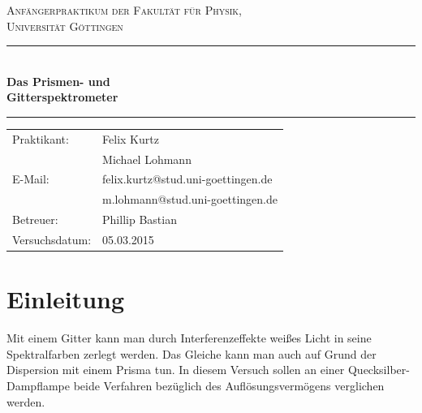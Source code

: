\documentclass[12pt,a4paper,titlepage,headinclude,bibtotoc]{scrartcl}
\begin{document}
\begin{titlepage}
\centering
\textsc{\Large Anfängerpraktikum der Fakultät für
  Physik,\\[1.5ex] Universität Göttingen}

\vspace*{4.2cm}

\rule{\textwidth}{1pt}\\[0.5cm]
{\huge \bfseries
  Das Prismen- und\\[1.5ex]
  Gitterspektrometer}\\[0.5cm]
\rule{\textwidth}{1pt}

\vspace*{3.0cm}

\begin{Large}
\begin{tabular}{ll}
Praktikant:
 	&  Felix Kurtz\\
 	&  Michael Lohmann\\

E-Mail: 
	&  felix.kurtz@stud.uni-goettingen.de\\
	& m.lohmann@stud.uni-goettingen.de\\

 Betreuer: & Phillip Bastian\\
 Versuchsdatum: &  05.03.2015\\
\end{tabular}
\end{Large}

\vspace*{0.8cm}

\begin{Large}
\end{Large}

\end{titlepage}

\tableofcontents

\newpage

\section{Einleitung}
\label{sec:einleitung}
Mit einem Gitter kann man durch Interferenzeffekte weißes Licht in seine Spektralfarben zerlegt werden.
Das Gleiche kann man auch auf Grund der Dispersion mit einem Prisma tun.
In diesem Versuch sollen an einer Quecksilber-Dampflampe beide Verfahren  bezüglich des Auflösungsvermögens verglichen werden.
\end{document}
